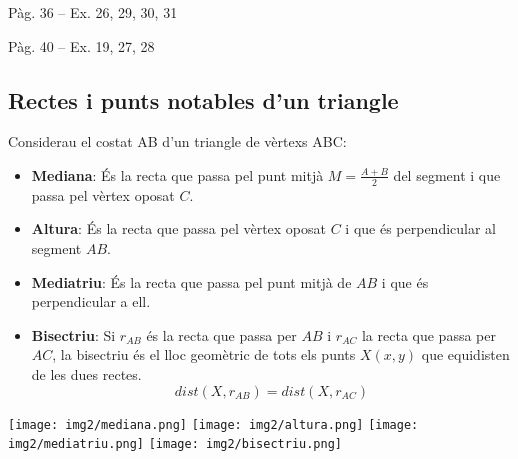 \documentclass[11pt, a4paper, pdf]{article}
\renewcommand{\hot}[1][]{
	\ifthenelse{\equal{#1}{}}{$\mathbf{\bigstar}$ \underline{\textbf{LLIBRE}}: }{\myrepeat{#1}{$\mathbf{\bigstar}$}}
}
\begin{document}
\hot Pàg. 36 -- Ex. 26, 29, 30, 31

\hot Pàg. 40 -- Ex. 19, 27, 28

\subsection{Rectes i punts notables d'un triangle}

\begin{theorybox}
	
	Considerau el costat AB d'un triangle de vèrtexs ABC:
	
	\begin{itemize}
		\item \textbf{Mediana}: És la recta que passa pel punt mitjà $M=\frac{A+B}{2}$ del segment i que passa pel vèrtex oposat $C$.
		
		\item \textbf{Altura}: És la recta que passa pel vèrtex oposat $C$ i que és perpendicular al segment $AB$.
		
		\item \textbf{Mediatriu}: És la recta que passa pel punt mitjà de $AB$ i que és perpendicular a ell.
		
		\item \textbf{Bisectriu}: Si $r_{AB}$ és la recta que passa per $AB$ i $r_{AC}$ la recta que passa per $AC$, la bisectriu és el lloc geomètric de tots els punts $X(x,y)$ que equidisten de les dues rectes.
		\begin{equation*}
		dist(X,r_{AB}) = dist(X,r_{AC})
		\end{equation*}
	\end{itemize}
	
	
	\begin{center}
		
		\texttt{[image: img2/mediana.png]}
		\texttt{[image: img2/altura.png]}
		\texttt{[image: img2/mediatriu.png]}
		\texttt{[image: img2/bisectriu.png]}
		
	\end{center}
\end{theorybox}
\end{document}
